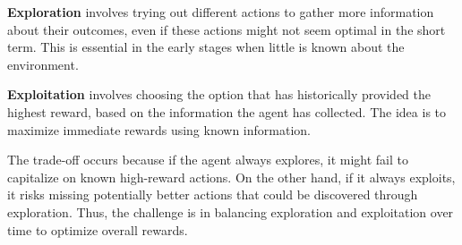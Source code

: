\documentclass[11pt]{article}
\begin{document}
\textbf{Exploration} involves trying out different actions to gather more information about their outcomes, even if these actions might not seem optimal in the short term. This is essential in the early stages when little is known about the environment.

\textbf{Exploitation} involves choosing the option that has historically provided the highest reward, based on the information the agent has collected. The idea is to maximize immediate rewards using known information.

The trade-off occurs because if the agent always explores, it might fail to capitalize on known high-reward actions. On the other hand, if it always exploits, it risks missing potentially better actions that could be discovered through exploration. Thus, the challenge is in balancing exploration and exploitation over time to optimize overall rewards.
\end{document}
